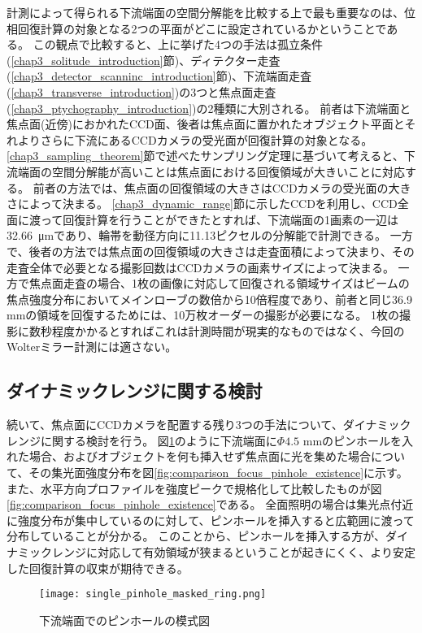 計測によって得られる下流端面の空間分解能を比較する上で最も重要なのは、位相回復計算の対象となる2つの平面がどこに設定されているかということである。
この観点で比較すると、上に挙げた4つの手法は孤立条件(\ref{chap3_solitude_introduction}節)、ディテクター走査(\ref{chap3_detector_scanninc_introduction}節)、下流端面走査(\ref{chap3_transverse_introduction})の3つと焦点面走査(\ref{chap3_ptychography_introduction})の2種類に大別される。
前者は下流端面と焦点面(近傍)におかれたCCD面、後者は焦点面に置かれたオブジェクト平面とそれよりさらに下流にあるCCDカメラの受光面が回復計算の対象となる。
\ref{chap3_sampling_theorem}節で述べたサンプリング定理に基づいて考えると、下流端面の空間分解能が高いことは焦点面における回復領域が大きいことに対応する。
前者の方法では、焦点面の回復領域の大きさはCCDカメラの受光面の大きさによって決まる。
\ref{chap3_dynamic_range}節に示したCCDを利用し、CCD全面に渡って回復計算を行うことができたとすれば、下流端面の1画素の一辺は\SI{32.66}{\micro \metre}であり、輪帯を動径方向に11.13ピクセルの分解能で計測できる。
一方で、後者の方法では焦点面の回復領域の大きさは走査面積によって決まり、その走査全体で必要となる撮影回数はCCDカメラの画素サイズによって決まる。
一方で焦点面走査の場合、1枚の画像に対応して回復される領域サイズはビームの焦点強度分布においてメインローブの数倍から10倍程度であり、前者と同じ36.9 mmの領域を回復するためには、10万枚オーダーの撮影が必要になる。
1枚の撮影に数秒程度かかるとすればこれは計測時間が現実的なものではなく、今回のWolterミラー計測には適さない。

\subsection{ダイナミックレンジに関する検討}
\label{chap3_comparison_dynamic_range}

続いて、焦点面にCCDカメラを配置する残り3つの手法について、ダイナミックレンジに関する検討を行う。
図\ref{fig:single_pinhole_mask}のように下流端面に$\Phi 4.5$ mmのピンホールを入れた場合、およびオブジェクトを何も挿入せず焦点面に光を集めた場合について、その集光面強度分布を図\ref{fig:comparison_focus_pinhole_existence}に示す。
また、水平方向プロファイルを強度ピークで規格化して比較したものが図\ref{fig:comparison_focus_pinhole_existence}である。
全面照明の場合は集光点付近に強度分布が集中しているのに対して、ピンホールを挿入すると広範囲に渡って分布していることが分かる。
このことから、ピンホールを挿入する方が、ダイナミックレンジに対応して有効領域が狭まるということが起きにくく、より安定した回復計算の収束が期待できる。

\begin{figure}[!ht]
\centering
\texttt{[image: single\_pinhole\_masked\_ring.png]}
\caption{下流端面でのピンホールの模式図}
\label{fig:single_pinhole_mask}
\end{figure}


